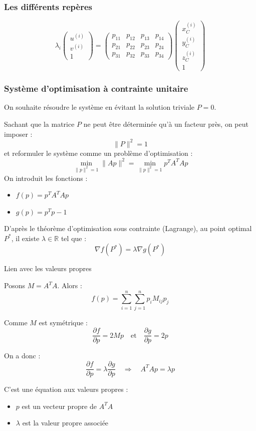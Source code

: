 \begin{frame}
\frametitle{Les différents repères}

\[
\lambda_i 
\begin{pmatrix}
u^{(i)} \\
v^{(i)} \\
1
\end{pmatrix}
=
\begin{pmatrix}
p_{11} & p_{12} & p_{13} & p_{14} \\
p_{21} & p_{22} & p_{23} & p_{24} \\
p_{31} & p_{32} & p_{33} & p_{34}
\end{pmatrix}
\begin{pmatrix}
x_C^{(i)} \\
y_C^{(i)} \\
z_C^{(i)} \\
1
\end{pmatrix}
\]
\end{frame}

\begin{frame}
\frametitle{Système d’optimisation à contrainte unitaire}
\label{optimisation-appendix}
On souhaite résoudre le système en évitant la solution triviale \( P = 0 \).  
\pause

Sachant que la matrice \( P \) ne peut être déterminée qu’à un facteur près, on peut imposer :
\[
\|P\|^2 = 1
\]
et reformuler le système comme un problème d’optimisation :
\pause
\[
\min_{\|p\|^2 = 1} \|Ap\|^2 = \min_{\|p\|^2 = 1} p^T A^T A p
\]
\pause
On introduit les fonctions :
\begin{itemize}
  \item \( f(p) = p^T A^T A p \)
  \item \( g(p) = p^T p - 1 \)
\end{itemize}
\pause
D’après le théorème d’optimisation sous contrainte (Lagrange), au point optimal \( P^* \), il existe \( \lambda \in \mathbb{R} \) tel que :
\[
\nabla f(P^*) = \lambda \nabla g(P^*)
\]
\end{frame}



\begin{frame}{Lien avec les valeurs propres}

Posons \( M = A^T A \).  
Alors :
\[
f(p) = \sum_{i=1}^n \sum_{j=1}^n p_i M_{ij} p_j
\]
\pause

Comme \( M \) est symétrique :
\[
\frac{\partial f}{\partial p} = 2Mp
\quad \text{et} \quad
\frac{\partial g}{\partial p} = 2p
\]
\pause

On a donc :
\[
\frac{\partial f}{\partial p} = \lambda \frac{\partial g}{\partial p}
\quad \Rightarrow \quad
\boxed{A^T A p = \lambda p}
\]
\pause

C’est une équation aux valeurs propres :
\begin{itemize}
  \item \( p \) est un vecteur propre de \( A^T A \)
  \item \( \lambda \) est la valeur propre associée
\end{itemize}
\end{frame}


